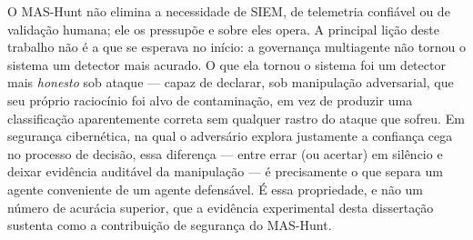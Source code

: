 O MAS-Hunt não elimina a necessidade de SIEM, de telemetria confiável ou de
validação humana; ele os pressupõe e sobre eles opera. A principal lição deste
trabalho não é a que se esperava no início: a governança multiagente não tornou o
sistema um detector mais acurado. O que ela tornou o sistema foi um detector mais
\emph{honesto} sob ataque --- capaz de declarar, sob manipulação adversarial, que
seu próprio raciocínio foi alvo de contaminação, em vez de produzir uma
classificação aparentemente correta sem qualquer rastro do ataque que sofreu. Em
segurança cibernética, na qual o adversário explora justamente a confiança cega no
processo de decisão, essa diferença --- entre errar (ou acertar) em silêncio e
deixar evidência auditável da manipulação --- é precisamente o que separa um
agente conveniente de um agente defensável. É essa propriedade, e não um número de
acurácia superior, que a evidência experimental desta dissertação sustenta como a
contribuição de segurança do MAS-Hunt.
